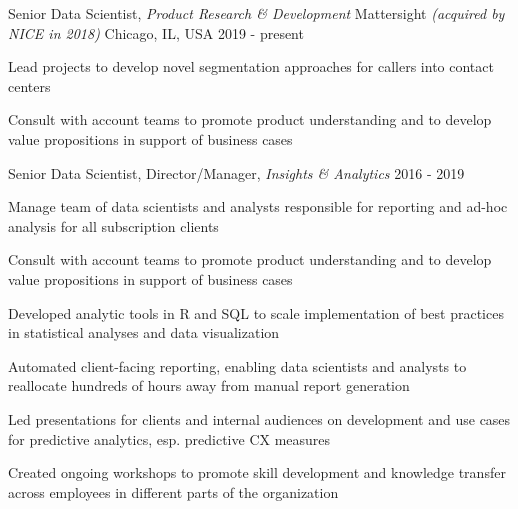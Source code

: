 
\begin{cventries}

 \cventry
    {Senior Data Scientist, \textit{Product Research \& Development}} %
    {Mattersight \textit{\textmd{(acquired by NICE in 2018)}}} %
    {Chicago, IL, USA} %
    {2019 - present} %
    {
      \begin{cvitems}
        \item {Lead projects to develop novel segmentation approaches for callers into contact centers}
        \item {Consult with account teams to promote product understanding and to develop value propositions in support of business cases}
      \end{cvitems}
      }

  \cventry
    {Senior Data Scientist, Director/Manager, \textit{Insights \& Analytics}} %
    {} %
    {} %
    {2016 - 2019} %
    {
      \begin{cvitems}
        \item {Manage team of data scientists and analysts responsible for reporting and ad-hoc analysis for all subscription clients}
        \item {Consult with account teams to promote product understanding and to develop value propositions in support of business cases}
        \item {Developed analytic tools in R and SQL to scale implementation of best practices in statistical analyses and data visualization}
        \item {Automated client-facing reporting, enabling data scientists and analysts to reallocate hundreds of hours away from manual report generation}
        \item {Led presentations for clients and internal audiences on development and use cases for predictive analytics, esp. predictive CX measures}
        \item {Created ongoing workshops to promote skill development and knowledge transfer across employees in different parts of the organization}
      \end{cvitems}
    }


\end{cventries}
